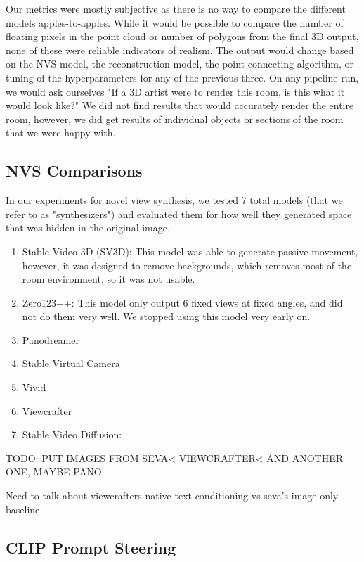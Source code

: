 \documentclass{article}
\begin{document}
Our metrics were mostly subjective as there is no way to compare the different models apples-to-apples. While it would be possible to compare the number of floating pixels in the point cloud or number of polygons from the final 3D output, none of these were reliable indicators of realism. The output would change based on the NVS model, the reconstruction model, the point connecting algorithm, or tuning of the hyperparameters for any of the previous three. On any pipeline run, we would ask ourselves "If a 3D artist were to render this room, is this what it would look like?" We did not find results that would accurately render the entire room, however, we did get results of individual objects or sections of the room that we were happy with.

\subsection{NVS Comparisons}
In our experiments for novel view synthesis, we tested 7 total models (that we refer to as "synthesizers") and evaluated them for how well they generated space that was hidden in the original image.

\begin{enumerate}
    \item Stable Video 3D (SV3D): This model was able to generate passive movement, however, it was designed to remove backgrounds, which removes most of the room environment, so it was not usable.
    \item Zero123++: This model only output 6 fixed views at fixed angles, and did not do them very well. We stopped using this model very early on.
    \item Panodreamer
    \item Stable Virtual Camera
    \item Vivid
    \item Viewcrafter
    \item Stable Video Diffusion:
\end{enumerate}


TODO: PUT IMAGES FROM SEVA< VIEWCRAFTER< AND ANOTHER ONE, MAYBE PANO

Need to talk about viewcrafters native text conditioning vs seva's image-only baseline


\subsection{CLIP Prompt Steering}
\end{document}
